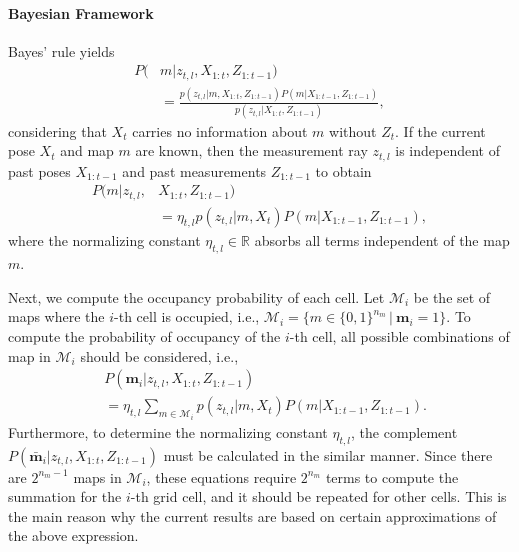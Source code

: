 \documentclass[letterpaper, 10pt, conference]{ieeeconf}
\newcommand{\refeqn}[1]{(\ref{eqn:#1})}
\renewcommand{\Re}{\ensuremath{\mathbb{R}}}
\begin{document}
\paragraph{Bayesian Framework}
Bayes' rule yields
\begin{align}
\label{eqn:BayesRuleRayISM}
P(&m|z_{t,l},X_{1:t},Z_{1:t-1})\nonumber
\\
&=\frac{p(z_{t,l}|m,X_{1:t},Z_{1:t-1})P(m|X_{1:t-1},Z_{1:t-1})}{p(z_{t,l}|X_{1:t},Z_{1:t-1})},
\end{align}
considering that $X_t$ carries no information about $m$ without $Z_t$.
If the current pose $X_t$ and map $m$ are known, then the measurement ray $z_{t,l}$ is independent of past poses $X_{1:t-1}$ and past measurements $Z_{1:t-1}$ to obtain
\begin{align}
P(m|z_{t,l},&X_{1:t},Z_{1:t-1})\nonumber
\\
&
=\eta_{t,l}p(z_{t,l}|m,X_{t})P(m|X_{1:t-1},Z_{1:t-1}),
\end{align}
where the normalizing constant $\eta_{t,l}\in\Re$ absorbs all terms independent of the map $m$.


Next, we compute the occupancy probability of each cell. Let $\mathcal{M}_i$ be the set of maps where the $i$-th cell is occupied, i.e., $\mathcal{M}_i =\{m\in\{0,1\}^{{n_m}}\,|\ \mathbf{m}_i=1\}$. To compute the probability of occupancy of the $i$-th cell, all possible combinations of map in $\mathcal{M}_i$ should be considered, i.e., 
\begin{align}
\label{eqn:InvSenModWithProbDens}
&P(\mathbf{m}_i|z_{t,l},X_{1:t},Z_{1:t-1})\nonumber
\\
&=\eta_{t,l}\sum_{m\in\mathcal{M}_i}p(z_{t,l}|m,X_{t})P(m|X_{1:t-1},Z_{1:t-1}).
\end{align}
Furthermore, to determine the normalizing constant $\eta_{t,l}$, the complement $P(\bar{\mathbf{m}}_i|z_{t,l},X_{1:t},Z_{1:t-1})$ must be calculated in the similar manner. Since there are $2^{n_{m}-1}$ maps in $\mathcal{M}_i$, these equations require $2^{n_m}$ terms to compute the summation for the $i$-th grid cell, and it should be repeated for other cells. This is the main reason why the current results are based on certain approximations of the above expression. 
\end{document}
